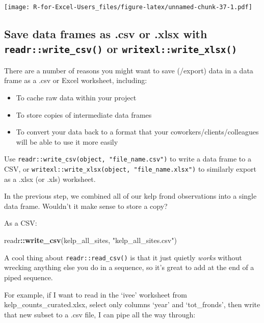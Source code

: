 \documentclass[]{book}
\newenvironment{Shaded}{\begin{snugshade}}{\end{snugshade}}
\newcommand{\KeywordTok}[1]{\textcolor[rgb]{0.13,0.29,0.53}{\textbf{#1}}}
\newcommand{\NormalTok}[1]{#1}
\newcommand{\OperatorTok}[1]{\textcolor[rgb]{0.81,0.36,0.00}{\textbf{#1}}}
\newcommand{\StringTok}[1]{\textcolor[rgb]{0.31,0.60,0.02}{#1}}
\providecommand{\tightlist}{%
  \setlength{\itemsep}{0pt}\setlength{\parskip}{0pt}}
\begin{document}
\texttt{[image: R-for-Excel-Users\_files/figure-latex/unnamed-chunk-37-1.pdf]}

\hypertarget{save-data-frames-as-.csv-or-.xlsx-with-readrwrite_csv-or-writexlwrite_xlsx}{%
\subsection{\texorpdfstring{Save data frames as .csv or .xlsx with \texttt{readr::write\_csv()} or \texttt{writexl::write\_xlsx()}}{Save data frames as .csv or .xlsx with readr::write\_csv() or writexl::write\_xlsx()}}\label{save-data-frames-as-.csv-or-.xlsx-with-readrwrite_csv-or-writexlwrite_xlsx}}

There are a number of reasons you might want to save (/export) data in a data frame as a .csv or Excel worksheet, including:

\begin{itemize}
\tightlist
\item
  To cache raw data within your project
\item
  To store copies of intermediate data frames
\item
  To convert your data back to a format that your coworkers/clients/colleagues will be able to use it more easily
\end{itemize}

Use \texttt{readr::write\_csv(object,\ "file\_name.csv")} to write a data frame to a CSV, or \texttt{writexl::write\_xlsx(object,\ "file\_name.xlsx")} to similarly export as a .xlsx (or .xls) worksheet.

In the previous step, we combined all of our kelp frond observations into a single data frame. Wouldn't it make sense to store a copy?

As a CSV:

\begin{Shaded}
\begin{Highlighting}[]
\NormalTok{readr}\OperatorTok{::}\KeywordTok{write_csv}\NormalTok{(kelp_all_sites, }\StringTok{"kelp_all_sites.csv"}\NormalTok{)}
\end{Highlighting}
\end{Shaded}

A cool thing about \texttt{readr::read\_csv()} is that it just quietly \emph{works} without wrecking anything else you do in a sequence, so it's great to add at the end of a piped sequence.

For example, if I want to read in the `ivee' worksheet from kelp\_counts\_curated.xlsx, select only columns `year' and `tot\_fronds', then write that new subset to a .csv file, I can pipe all the way through:
\end{document}
